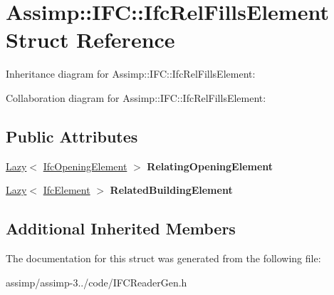 \hypertarget{struct_assimp_1_1_i_f_c_1_1_ifc_rel_fills_element}{\section{Assimp\+:\+:I\+F\+C\+:\+:Ifc\+Rel\+Fills\+Element Struct Reference}
\label{struct_assimp_1_1_i_f_c_1_1_ifc_rel_fills_element}
}


Inheritance diagram for Assimp\+:\+:I\+F\+C\+:\+:Ifc\+Rel\+Fills\+Element\+:


Collaboration diagram for Assimp\+:\+:I\+F\+C\+:\+:Ifc\+Rel\+Fills\+Element\+:
\subsection*{Public Attributes}
\begin{DoxyCompactItemize}
\item 
\hypertarget{struct_assimp_1_1_i_f_c_1_1_ifc_rel_fills_element_ab881de8c0b549782b24df76182f947f9}{\hyperlink{struct_assimp_1_1_s_t_e_p_1_1_lazy}{Lazy}$<$ \hyperlink{struct_assimp_1_1_i_f_c_1_1_ifc_opening_element}{Ifc\+Opening\+Element} $>$ {\bfseries Relating\+Opening\+Element}}\label{struct_assimp_1_1_i_f_c_1_1_ifc_rel_fills_element_ab881de8c0b549782b24df76182f947f9}

\item 
\hypertarget{struct_assimp_1_1_i_f_c_1_1_ifc_rel_fills_element_ada6955ba197d94f2fe44c10ec956a485}{\hyperlink{struct_assimp_1_1_s_t_e_p_1_1_lazy}{Lazy}$<$ \hyperlink{struct_assimp_1_1_i_f_c_1_1_ifc_element}{Ifc\+Element} $>$ {\bfseries Related\+Building\+Element}}\label{struct_assimp_1_1_i_f_c_1_1_ifc_rel_fills_element_ada6955ba197d94f2fe44c10ec956a485}

\end{DoxyCompactItemize}
\subsection*{Additional Inherited Members}


The documentation for this struct was generated from the following file\+:\begin{DoxyCompactItemize}
\item 
assimp/assimp-\/3../code/I\+F\+C\+Reader\+Gen.\+h\end{DoxyCompactItemize}
